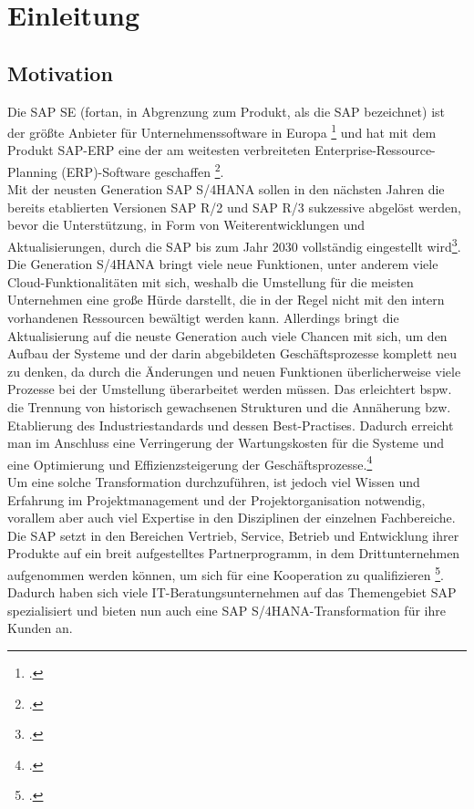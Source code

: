 \section{Einleitung}
\subsection{Motivation}
Die SAP SE (fortan, in Abgrenzung zum Produkt, als \glqq{}die\grqq{} SAP bezeichnet) ist der größte Anbieter für Unternehmenssoftware in Europa \footcite{sap-about} und hat mit dem Produkt SAP-ERP eine der am weitesten verbreiteten Enterprise-Ressource-Planning (ERP)-Software geschaffen \footcite{}. \\Mit der neusten Generation SAP S/4HANA sollen in den nächsten Jahren die bereits etablierten Versionen SAP R/2 und SAP R/3 sukzessive abgelöst werden, bevor die Unterstützung, in Form von Weiterentwicklungen und Aktualisierungen, durch die SAP bis zum Jahr 2030 vollständig eingestellt wird\footcite{sap-support}. Die Generation S/4HANA bringt viele neue Funktionen, unter anderem viele Cloud-Funktionalitäten mit sich, weshalb die Umstellung für die meisten Unternehmen eine große Hürde darstellt, die in der Regel nicht mit den intern vorhandenen Ressourcen bewältigt werden kann. Allerdings bringt die Aktualisierung auf die neuste Generation auch viele Chancen mit sich, um den Aufbau der Systeme und der darin abgebildeten Geschäftsprozesse komplett neu zu denken, da durch die Änderungen und neuen Funktionen überlicherweise viele Prozesse bei der Umstellung überarbeitet werden müssen. Das erleichtert bspw. die Trennung von historisch gewachsenen Strukturen und die Annäherung bzw. Etablierung des Industriestandards und dessen Best-Practises. Dadurch erreicht man im Anschluss eine Verringerung der Wartungskosten für die Systeme und eine Optimierung und Effizienzsteigerung der Geschäftsprozesse.\footcite{}\\ Um eine solche Transformation durchzuführen, ist jedoch viel Wissen und Erfahrung im Projektmanagement und der Projektorganisation notwendig, vorallem aber auch viel Expertise in den Disziplinen der einzelnen Fachbereiche.
Die SAP setzt in den Bereichen Vertrieb, Service, Betrieb und  Entwicklung ihrer Produkte auf ein breit aufgestelltes Partnerprogramm, in dem Drittunternehmen aufgenommen werden können, um sich für eine Kooperation zu qualifizieren \footcite{sap-partner}. Dadurch haben sich viele IT-Beratungsunternehmen auf das Themengebiet SAP spezialisiert und bieten nun auch eine SAP S/4HANA-Transformation für ihre Kunden an.

